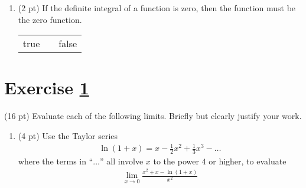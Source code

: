 


\begin{enumerate}[resume,label=(\alph*)]
\item\label{itm : Exam4P2Q1e} (2 pt) If the definite integral of a function is zero, then the function must be the zero function.
\begin{center}
\begin{tabular}{c c c}
true	&	\hspace{1in}	&	false
\end{tabular}
\end{center}
\end{enumerate}






%
%
%
%


\newpage

\section{Exercise \ref{sec : Math112 Spring2022 MockExam2 Q2}}
\label{sec : Math112 Spring2022 MockExam2 Q2}

(16 pt) Evaluate each of the following limits. Briefly but clearly justify your work.



\begin{enumerate}[label=(\alph*)]
\item\label{itm : Exam2Q2a} (4 pt) Use the Taylor series
\begin{align}
\ln(1 + x)
=
x - \frac{1}{2} x^{2} + \frac{1}{3} x^{3} - \ldots%
\label{eq : Exam2Q2c Taylor Series ln(1 + x)}
\end{align}
where the terms in ``$\ldots$'' all involve $x$ to the power $4$ or higher, to evaluate
\begin{align*}
\lim_{x \rightarrow 0} \frac{x^{2} + x - \ln(1 + x)}{x^{2}}
\end{align*}
\end{enumerate}

